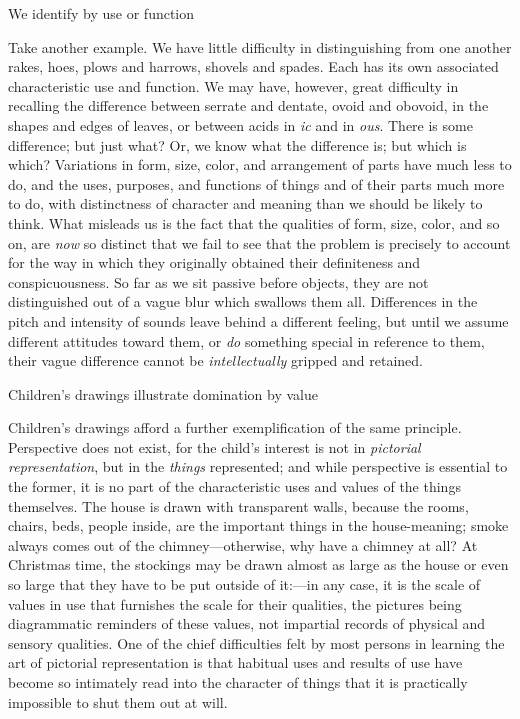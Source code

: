 \documentclass[letterpaper]{book}
\begin{document}
We identify by use or function

Take another example. We have little difficulty in distinguishing from
one another rakes, hoes, plows and harrows, shovels and spades. Each has
its own associated characteristic use and function. We may have,
however, great difficulty in recalling the difference between serrate
and dentate, ovoid and obovoid, in the shapes and edges of leaves, or
between acids in \emph{ic} and in \emph{ous}. There is some difference;
but just what? Or, we know what the difference is; but which is which?
Variations in form, size, color, and arrangement of parts have much less
to do, and the uses, purposes, and functions of things and of their
parts much more to do, with distinctness of character and meaning than
we should be likely to think. What misleads us is the fact that the
qualities of form, size, color, and so on, are \emph{now} so distinct
that we fail to see that the problem is precisely to account for the way
in which they originally obtained their definiteness and
conspicuousness. So far as we sit passive before objects, they are not
distinguished out of a vague blur which swallows them all. Differences
in the pitch and intensity of sounds leave behind a different feeling,
but until we assume different attitudes toward them, or \emph{do}
something special in reference to them, their vague difference cannot be
\emph{intellectually} gripped and retained.



Children's drawings illustrate domination by value

Children's drawings afford a further exemplification of the same
principle. Perspective does not exist, for the child's interest is not
in \emph{pictorial representation}, but in the \emph{things}
represented; and while perspective is essential to the former, it is no
part of the characteristic uses and values of the things themselves. The
house
is drawn with transparent walls, because the rooms, chairs, beds, people
inside, are the important things in the house-meaning; smoke always
comes out of the chimney---otherwise, why have a chimney at all? At
Christmas time, the stockings may be drawn almost as large as the house
or even so large that they have to be put outside of it:---in any case,
it is the scale of values in use that furnishes the scale for their
qualities, the pictures being diagrammatic reminders of these values,
not impartial records of physical and sensory qualities. One of the
chief difficulties felt by most persons in learning the art of pictorial
representation is that habitual uses and results of use have become so
intimately read into the character of things that it is practically
impossible to shut them out at will.
\end{document}
